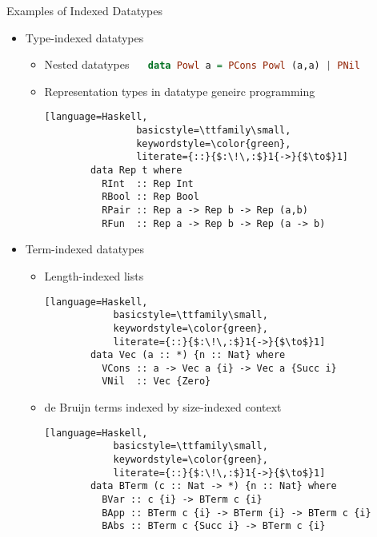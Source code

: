 \documentclass[final]{beamer}
\begin{document}
\begin{frame}[fragile]
\begin{columns}[t]
\begin{column}{.315\linewidth}
\begin{block}{Examples of Indexed Datatypes}
\begin{itemize}
\item Type-indexed datatypes
	\begin{itemize}
		\item Nested datatypes $\quad$
			\lstinline[language=Haskell,
				basicstyle=\ttfamily\small,
				keywordstyle=\color{green}]!data Powl a = PCons Powl (a,a) | PNil!
		\item Representation types in datatype geneirc programming
		\begin{lstlisting}[language=Haskell,
				basicstyle=\ttfamily\small,
				keywordstyle=\color{green},
				literate={::}{$:\!\,:$}1{->}{$\to$}1]
		data Rep t where
		  RInt  :: Rep Int
		  RBool :: Rep Bool
		  RPair :: Rep a -> Rep b -> Rep (a,b)
		  RFun  :: Rep a -> Rep b -> Rep (a -> b)
		\end{lstlisting}
	\end{itemize}
\item Term-indexed datatypes
	\begin{itemize}
        	\item Length-indexed lists
		\begin{lstlisting}[language=Haskell,
			basicstyle=\ttfamily\small,
			keywordstyle=\color{green},
			literate={::}{$:\!\,:$}1{->}{$\to$}1]
		data Vec (a :: *) {n :: Nat} where
		  VCons :: a -> Vec a {i} -> Vec a {Succ i}
		  VNil  :: Vec {Zero}
		\end{lstlisting}
		\item de Bruijn terms indexed by size-indexed context
		\begin{lstlisting}[language=Haskell,
			basicstyle=\ttfamily\small,
			keywordstyle=\color{green},
			literate={::}{$:\!\,:$}1{->}{$\to$}1]
		data BTerm (c :: Nat -> *) {n :: Nat} where
		  BVar :: c {i} -> BTerm c {i}
		  BApp :: BTerm c {i} -> BTerm {i} -> BTerm c {i}
		  BAbs :: BTerm c {Succ i} -> BTerm c {i}
		\end{lstlisting}
	\end{itemize}
\end{itemize} %
\end{block}

\end{column}
\begin{column}{.315\linewidth}


\end{column}
\end{columns}
\end{frame}
\end{document}

